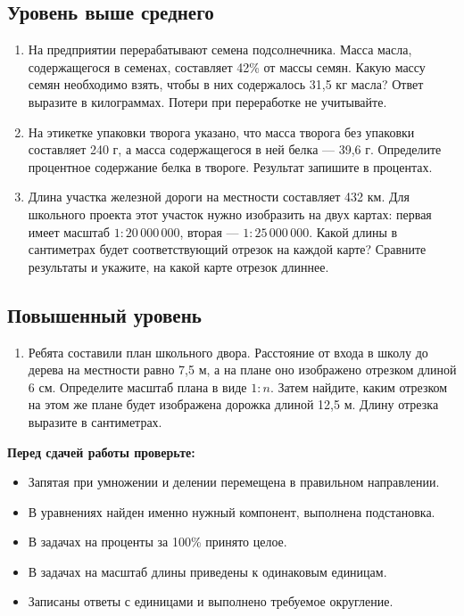 \documentclass[a4paper,12pt]{article}
\newcommand{\idea}[1]{\textcolor{darkaccent}{\textbf{#1}}}
\begin{document}
\subsection{Уровень выше среднего}
\begin{enumerate}[start=7]
\item На предприятии перерабатывают семена подсолнечника. Масса масла, содержащегося в семенах, составляет 42\% от массы семян. Какую массу семян необходимо взять, чтобы в них содержалось 31,5 кг масла? Ответ выразите в килограммах. Потери при переработке не учитывайте.
\item На этикетке упаковки творога указано, что масса творога без упаковки составляет 240 г, а масса содержащегося в ней белка --- 39,6 г. Определите процентное содержание белка в твороге. Результат запишите в процентах.
\item Длина участка железной дороги на местности составляет 432 км. Для школьного проекта этот участок нужно изобразить на двух картах: первая имеет масштаб $1:20\,000\,000$, вторая --- $1:25\,000\,000$. Какой длины в сантиметрах будет соответствующий отрезок на каждой карте? Сравните результаты и укажите, на какой карте отрезок длиннее.
\end{enumerate}
\subsection{Повышенный уровень}
\begin{enumerate}[start=10]
\item Ребята составили план школьного двора. Расстояние от входа в школу до дерева на местности равно 7,5 м, а на плане оно изображено отрезком длиной 6 см. Определите масштаб плана в виде $1:n$. Затем найдите, каким отрезком на этом же плане будет изображена дорожка длиной 12,5 м. Длину отрезка выразите в сантиметрах.
\end{enumerate}
\vspace{10mm}
\idea{Перед сдачей работы проверьте:}
\begin{itemize}[label=$\square$]
\item Запятая при умножении и делении перемещена в правильном направлении.
\item В уравнениях найден именно нужный компонент, выполнена подстановка.
\item В задачах на проценты за 100\% принято целое.
\item В задачах на масштаб длины приведены к одинаковым единицам.
\item Записаны ответы с единицами и выполнено требуемое округление.
\end{itemize}
\clearpage
\end{document}

